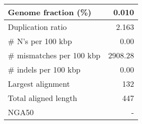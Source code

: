 \documentclass[12pt,a4paper]{article}
\begin{document}
\begin{table}[ht]
\begin{center}
\begin{tabular}{|l*{1}{|r}|}
Genome fraction (\%) & 0.010 \\ \hline
Duplication ratio & 2.163 \\ \hline
\# N's per 100 kbp & 0.00 \\ \hline
\# mismatches per 100 kbp & 2908.28 \\ \hline
\# indels per 100 kbp & 0.00 \\ \hline
Largest alignment & 132 \\ \hline
Total aligned length & 447 \\ \hline
NGA50 & - \\ \hline
\end{tabular}
\end{center}
\end{table}
\end{document}

